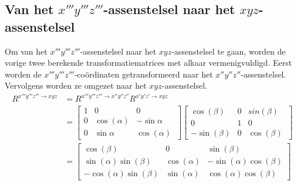 \subsection{Van het $x'''y'''z'''$-assenstelsel naar het $xyz$-assenstelsel}
Om van het $x'''y'''z'''$-assenstelsel naar het $xyz$-assenstelsel te gaan, worden de vorige twee berekende transformatiematrices met alkaar vermenigvuldigd. Eerst worden de $x'''y'''z'''$-co\"ordinaten getransformeerd naar het $x''y''z''$-assenstelsel. Vervolgens worden ze omgezet naar het $xyz$-assenstelsel.
\begin{equation*}
\begin{split}
R^{x'''y'''z''' \rightarrow xyz} & =R^{x'''y'''z''' \rightarrow x''y''z''}R^{x'y'z' \rightarrow xyz} \\
&=
  \begin{bmatrix}
      1 & 0 & 0\\
      0 & \cos(\alpha) & -\sin{\alpha}\\ 
      0 & \sin{\alpha} & \cos(\alpha)\
      \end{bmatrix}
  \begin{bmatrix}
      \cos(\beta) & 0 & sin(\beta)\\
      0 & 1 & 0\\ 
      -\sin(\beta) & 0 & \cos(\beta)\
      \end{bmatrix} \\
&=
  \begin{bmatrix}
      \cos(\beta) & 0 & \sin(\beta)\\
      \sin(\alpha)\sin(\beta) & \cos(\alpha) & -\sin(\alpha)\cos(\beta)\\
      -\cos(\alpha)\sin(\beta) & \sin(\alpha) & \cos(\alpha)\cos(\beta)\  
      \end{bmatrix}
\end{split}
\end{equation*}